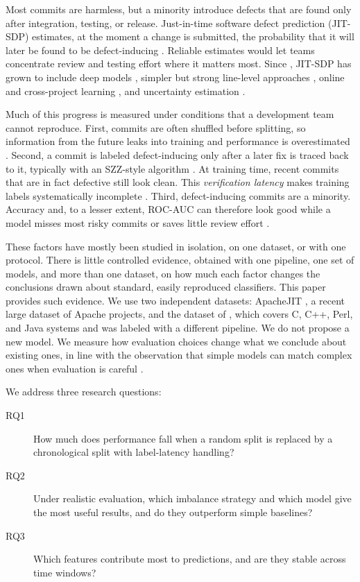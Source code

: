 \documentclass[11pt,a4paper]{article}
\begin{document}
Most commits are harmless, but a minority introduce defects that are found only after integration, testing, or release. Just-in-time software defect prediction (JIT-SDP) estimates, at the moment a change is submitted, the probability that it will later be found to be defect-inducing \citep{mockus2000,kamei2013}. Reliable estimates would let teams concentrate review and testing effort where it matters most. Since \citet{kamei2013}, JIT-SDP has grown to include deep models \citep{hoang2019,hoang2020}, simpler but strong line-level approaches \citep{pornprasit2021}, online and cross-project learning \citep{tabassum2022,cabral2022}, and uncertainty estimation \citep{shahini2024}.

Much of this progress is measured under conditions that a development team cannot reproduce. First, commits are often shuffled before splitting, so information from the future leaks into training and performance is overestimated \citep{tantithamthavorn2017,falessi2020,song2023a}. Second, a commit is labeled defect-inducing only after a later fix is traced back to it, typically with an SZZ-style algorithm \citep{sliwerski2005}. At training time, recent commits that are in fact defective still look clean. This \emph{verification latency} makes training labels systematically incomplete \citep{cabral2019}. Third, defect-inducing commits are a minority. Accuracy and, to a lesser extent, ROC-AUC can therefore look good while a model misses most risky commits or saves little review effort \citep{yang2016,saito2015}.

These factors have mostly been studied in isolation, on one dataset, or with one protocol. There is little controlled evidence, obtained with one pipeline, one set of models, and more than one dataset, on how much each factor changes the conclusions drawn about standard, easily reproduced classifiers. This paper provides such evidence. We use two independent datasets: ApacheJIT \citep{keshavarz2022}, a recent large dataset of Apache projects, and the dataset of \citet{kamei2013}, which covers C, C++, Perl, and Java systems and was labeled with a different pipeline. We do not propose a new model. We measure how evaluation choices change what we conclude about existing ones, in line with the observation that simple models can match complex ones when evaluation is careful \citep{zeng2021}.

We address three research questions:
\begin{description}
\item[RQ1] How much does performance fall when a random split is replaced by a chronological split with label-latency handling?
\item[RQ2] Under realistic evaluation, which imbalance strategy and which model give the most useful results, and do they outperform simple baselines?
\item[RQ3] Which features contribute most to predictions, and are they stable across time windows?
\end{description}
\end{document}
